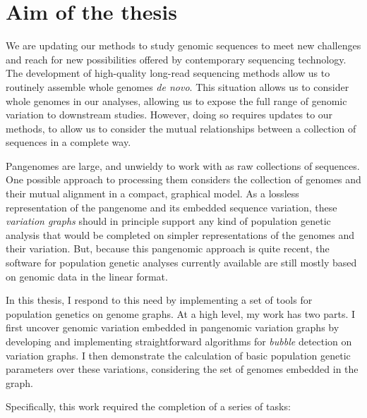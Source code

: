 
\chapter{Aim of the thesis} %

\label{Chapter4} %



We are updating our methods to study genomic sequences to meet new challenges and reach for new possibilities offered by contemporary sequencing technology. The development of high-quality long-read sequencing methods allow us to routinely assemble whole genomes \emph{de novo}. This situation allows us to consider whole genomes in our analyses, allowing us to expose the full range of genomic variation to downstream studies. However, doing so requires updates to our methods, to allow us to consider the mutual relationships between a collection of sequences in a complete way.

Pangenomes are large, and unwieldy to work with as raw collections of sequences. One possible approach to processing them considers the collection of genomes and their mutual alignment in a compact, graphical model. As a lossless representation of the pangenome and its embedded sequence variation, these \emph{variation graphs} should in principle support any kind of population genetic analysis that would be completed on simpler representations of the genomes and their variation. But, because this pangenomic approach is quite recent, the software for population genetic analyses currently available are still mostly based on genomic data in the linear format.

In this thesis, I respond to this need by implementing a set of tools for population genetics on genome graphs. At a high level, my work has two parts. I first uncover genomic variation embedded in pangenomic variation graphs by developing and implementing straightforward algorithms for \emph{bubble} detection on variation graphs. I then demonstrate the calculation of basic population genetic parameters over these variations, considering the set of genomes embedded in the graph.

Specifically, this work required the completion of a series of tasks:


